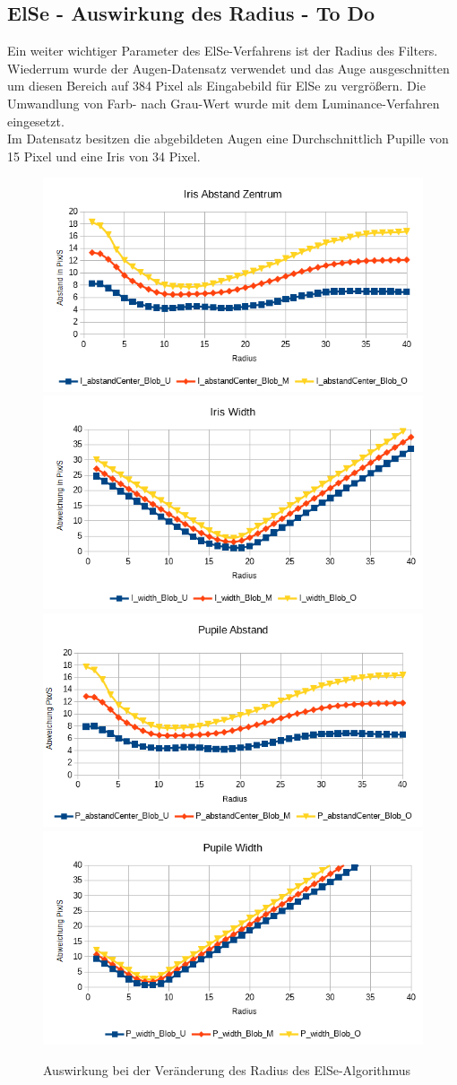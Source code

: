 \subsection{ElSe - Auswirkung des Radius - To Do}
Ein weiter wichtiger Parameter des ElSe-Verfahrens ist der Radius des Filters. Wiederrum wurde der Augen-Datensatz \cite{database_Eye} verwendet und das Auge ausgeschnitten um diesen Bereich auf 384 Pixel als Eingabebild für ElSe zu vergrößern. Die Umwandlung von Farb- nach Grau-Wert wurde mit dem Luminance-Verfahren eingesetzt.\\
Im Datensatz besitzen die abgebildeten Augen eine Durchschnittlich Pupille von 15 Pixel und eine Iris von 34 Pixel.
\begin{figure}
	\centering
	\includegraphics[width=0.49\linewidth]{Eye_Img/Radius_Iris_Zentrum}
	\includegraphics[width=0.49\linewidth]{Eye_Img/Radius_Iris_Width}
	\includegraphics[width=0.49\linewidth]{Eye_Img/Radius_Pupile_Zentrum}
	\includegraphics[width=0.49\linewidth]{Eye_Img/Radius_Pupile_Width}
	\caption{Auswirkung bei der Veränderung des Radius des ElSe-Algorithmus}
	\label{ElSE_Radius}
\end{figure}

